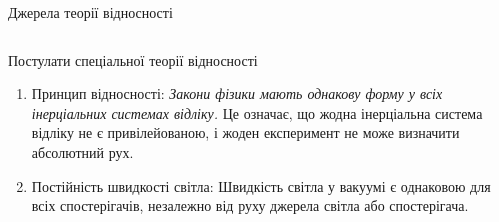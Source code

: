 \documentclass[]{beamer}
\begin{document}
\begin{frame}{Джерела теорії відносності}{}
\begin{columns}
\begin{column}{0.5\linewidth}
\begin{center}
				\end{center}
	\end{column}
\end{columns}
\end{frame}


\begin{frame}{Постулати спеціальної теорії відносності}{}


\begin{enumerate}\justifying
\item  \alert{Принцип відносності}: \emph{\color{blue}Закони фізики мають однакову форму у всіх інерціальних системах відліку.} Це означає, що жодна
інерціальна система
відліку не є привілейованою, і жоден експеримент не може визначити абсолютний рух.
\item \alert{Постійність швидкості світла}: Швидкість світла у вакуумі є однаковою для всіх спостерігачів, незалежно від руху джерела світла або
спостерігача.
\end{enumerate}

\end{frame}

%
%
%
\end{document}

